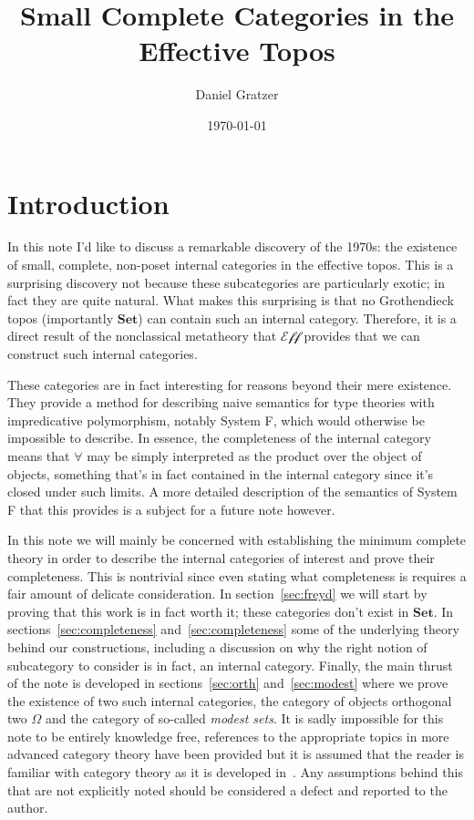 \documentclass[12pt]{amsart}
\title{Small Complete Categories in the Effective Topos}
\author{Daniel Gratzer}
\date{\today}
\newcommand{\cat}[1]{\ensuremath{\mathbf{#1}}}
\newcommand{\topos}[1]{\ensuremath{\mathcal{#1}}}
\newcommand{\set}{\cat{Set}}
\newcommand{\eff}{\topos{Eff}}
\begin{document}
\maketitle

\section{Introduction}\label{sec:introduction}

In this note I'd like to discuss a remarkable discovery of the 1970s:
the existence of small, complete, non-poset internal categories in the
effective topos. This is a surprising discovery not because these
subcategories are particularly exotic; in fact they are quite
natural. What makes this surprising is that no Grothendieck topos
(importantly $\set$) can contain such an internal category. Therefore,
it is a direct result of the nonclassical metatheory that $\eff$
provides that we can construct such internal categories.

These categories are in fact interesting for reasons beyond their mere
existence. They provide a method for describing naive semantics for
type theories with impredicative polymorphism, notably System F, which
would otherwise be impossible to describe. In essence, the
completeness of the internal category means that $\forall$ may be
simply interpreted as the product over the object of objects,
something that's in fact contained in the internal category since it's
closed under such limits. A more detailed description of the semantics
of System F that this provides is a subject for a future note however.

In this note we will mainly be concerned with establishing the minimum
complete theory in order to describe the internal categories of
interest and prove their completeness. This is nontrivial since even
stating what completeness is requires a fair amount of delicate
consideration. In section~\ref{sec:freyd} we will start by proving
that this work is in fact worth it; these categories don't exist in
$\set$. In sections~\ref{sec:completeness} and~\ref{sec:completeness}
some of the underlying theory behind our constructions, including a
discussion on why the right notion of subcategory to consider is in
fact, an internal category. Finally, the main thrust of the note is
developed in sections~\ref{sec:orth} and~\ref{sec:modest} where we
prove the existence of two such internal categories, the category of
objects orthogonal two $\Omega$ and the category of so-called
\emph{modest sets}. It is sadly impossible for this note to be
entirely knowledge free, references to the appropriate topics in more
advanced category theory have been provided but it is assumed that the
reader is familiar with category theory as it is developed
in~\citet{MacLane:98}. Any assumptions behind this that are not
explicitly noted should be considered a defect and reported to the
author.
\end{document}
